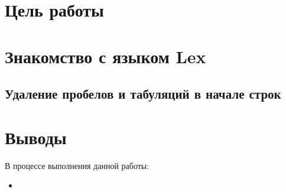 





\tableofcontents
\newpage

\section{Цель работы}

\section{Знакомство с языком Lex}

\subsection{Удаление пробелов и табуляций в начале строк}

\section{Выводы}

В процессе выполнения данной работы:

\begin{itemize}
	\item 
\end{itemize}


